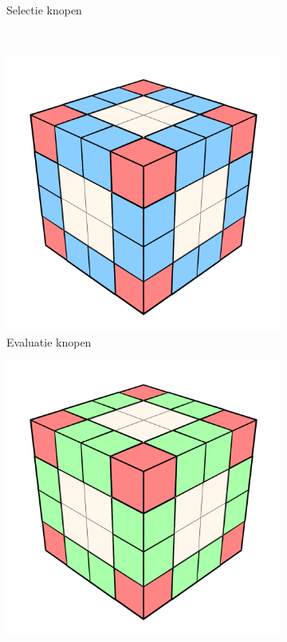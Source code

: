 \begin{figure}[t]
\begin{subfigure}[b]{.3\linewidth}
    \caption{Selectie knopen}%
    \label{fig:hs-p1f}%
  \end{subfigure}
  \\
  \begin{subfigure}[b]{.3\linewidth}
    \includegraphics[width=\textwidth]{./img/raw/hs-slt-algorithm/hs-slt-algorithm-7.png}%
    \caption{Evaluatie knopen}%
    \label{fig:hs-p1g}%
  \end{subfigure}
  \begin{subfigure}[b]{.3\linewidth}
    \includegraphics[width=\textwidth]{./img/raw/hs-slt-algorithm/hs-slt-algorithm-8.png}%

\end{subfigure}
\end{figure}
